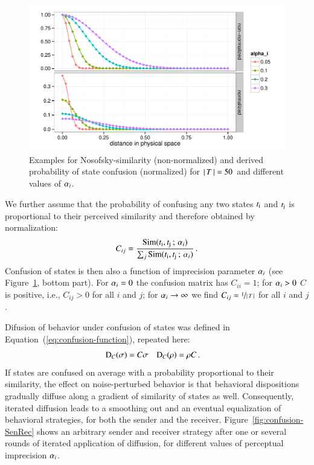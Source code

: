 \begin{figure}
  \centering

  \includegraphics[width=\textwidth]{plots/NosofskySim.pdf}

  \caption{Examples for Nosofsky-similarity (non-normalized) and
    derived probability of state confusion (normalized) for
    $\left \lvert \, T \, \right\rvert = 50$ and different
    values of $\alpha_i$.}
  \label{fig:NosofskySim}
\end{figure}





We further assume that the probability of confusing any two states
$t_{\mathrm{i}}$ and $t_{\mathrm{j}}$ is proportional to their perceived
similarity and therefore obtained by normalization:
\begin{align*}
  C_{ij} = \frac{\mathrm{Sim}(t_{\mathrm{i}}, t_{\mathrm{j}} \thinspace ; \thinspace
  \alpha_i)} {\sum_j \mathrm{Sim}(t_{\mathrm{i}}, t_{\mathrm{j}} \thinspace ; \thinspace
  \alpha_i)} \,.
\end{align*}
Confusion of states is then also a function of imprecision parameter
$\alpha_i$ (see Figure~\ref{fig:NosofskySim}, bottom part). For $\alpha_i
= 0$ the confusion matrix has $C_{ii} = 1$; for $\alpha_i > 0$ $C$ is
positive, i.e., $C_{ij} >0$ for all $i$ and $j$; for $\alpha_i
\rightarrow \infty$ we find $C_{ij} = \nicefrac{1}{\left \lvert \, T \, \right\rvert}$ for all
$i$ and $j$.

Difusion of behavior under confusion of states was defined in
Equation~(\ref{eq:confusion-function}), repeated here:
\begin{align*}
  \mathrm{D}_C(\sigma) & = C \sigma &    \mathrm{D}_C(\rho) & = \rho C\,.
\end{align*}
If states are confused on average with a probability proportional to
their similarity, the effect on noise-perturbed behavior is that
behavioral dispositions gradually diffuse along a gradient of
similarity of states as well. Consequently, iterated diffusion leads
to a smoothing out and an eventual equalization of behavioral
strategies, for both the sender and the
receiver. Figure~\ref{fig:confusion-SenRec} shows an arbitrary sender
and receiver strategy after one or several rounds of iterated
application of diffusion, for different values of perceptual
imprecision $\alpha_i$.

